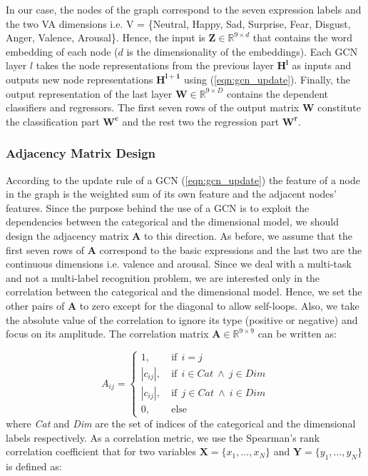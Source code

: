 \documentclass[a4paper, 10pt, conference]{ieeeconf}      \usepackage{FG2021}
\begin{document}
In our case, the nodes of the graph correspond to the seven expression labels and the two VA dimensions i.e. V = \{Neutral, Happy, Sad, Surprise, Fear, Disgust, Anger, Valence, Arousal\}. Hence, the input is $\mathbf{Z} \in \mathbb{R}^{9 \times d}$ that contains the word embedding of each node ($d$ is the dimensionality of the embeddings). Each GCN layer $l$ takes the node representations from the previous layer $\mathbf{H^l}$ as inputs and outputs new node representations  $\mathbf{H^{l+1}}$ using (\ref{eqn:gcn_update}). Finally, the output representation of the last layer $\mathbf{W} \in \mathbb{R} ^ {9 \times D}$ contains the dependent classifiers and regressors. The first seven rows of the output matrix $\mathbf{W}$ constitute the classification part $\mathbf{W^{c}}$ and the rest two the regression part $\mathbf{W^{r}}$.

\subsubsection{Adjacency Matrix Design}

According to the update rule of a GCN (\ref{eqn:gcn_update}) the feature of a node in the graph is the weighted sum of its own feature and the adjacent nodes’ features. Since the purpose behind the use of a GCN is to exploit the dependencies between the categorical and the dimensional model, we should design the adjacency matrix $\mathbf{A}$ to this direction. As before, we assume that the first seven rows of $\mathbf{A}$ correspond to the basic expressions and the last two are the continuous dimensions i.e. valence and arousal. Since we deal with a multi-task and not a multi-label recognition problem, we are interested only in the correlation between the categorical and the dimensional model. Hence, we set the other pairs of $\mathbf{A}$ to zero except for the diagonal to allow self-loops. Also, we take the absolute value of the correlation to ignore its type (positive or negative) and focus on its amplitude. The correlation matrix $\mathbf{A} \in \mathbb{R}^{9 \times 9}$ can be written as:

\begin{equation}
    A_{ij} = \begin{cases}
    1, &\ \text{if} \ \ i = j \\
    |c_{ij}|, &\ \text{if} \ \ i \in \textit{Cat} \ \land \ j \in \textit{Dim} \\
    |c_{ij}|, &\ \text{if} \ \ j \in \textit{Cat} \ \land \ i \in \textit{Dim} \\
    0, &\ \text{else}
    \end{cases}
\end{equation}
where \textit{Cat} and \textit{Dim} are the set of indices of the categorical and the dimensional labels respectively. As a correlation metric, we use the Spearman's rank correlation coefficient \cite{spearman1961proof} that for two variables $\mathbf{X} = \{x_1, ..., x_N\}$ and $\mathbf{Y} = \{y_1, ..., y_N\}$ is defined as:
\end{document}
